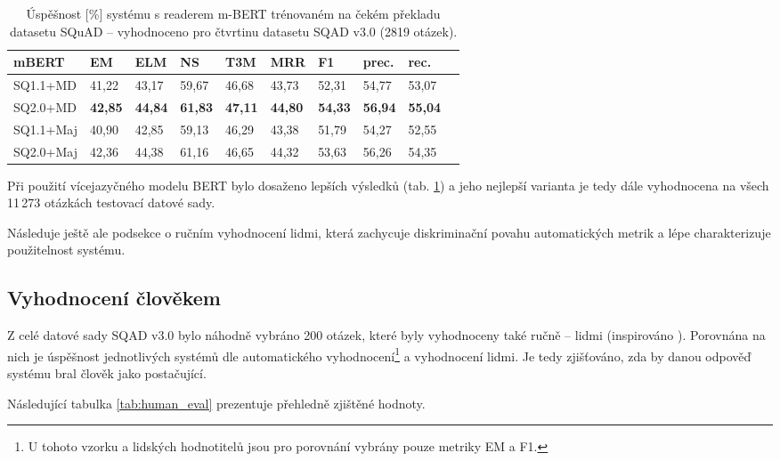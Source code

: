 \begin{table}[H]
    \centering
    \begin{tabular}{|l||l|l|l|l|l|l|l|l|l|}
        \hline
        \textbf{mBERT}  & \textbf{EM}   & ELM       & NS        & T3M       & MRR       & \textbf{F1}   & prec.         & rec.      \\ \hline\hline
            SQ1.1+MD    & 41,22         & 43,17     & 59,67     & 46,68     & 43,73     & 52,31         & 54,77         & 53,07     \\ \hline
            SQ2.0+MD    & \textbf{42,85}&\textbf{44,84}&\textbf{61,83}&\textbf{47,11}&\textbf{44,80}&\textbf{54,33}&\textbf{56,94}&\textbf{55,04}\\ \hline
            SQ1.1+Maj   & 40,90         & 42,85     & 59,13     & 46,29     & 43,38     & 51,79         & 54,27         & 52,55         \\ \hline
            SQ2.0+Maj   & 42,36         & 44,38     & 61,16     & 46,65     & 44,32     & 53,63         & 56,26         & 54,35     \\ \hline
    \end{tabular}
    \caption{Úspěšnost [\%] systému s readerem m-BERT trénovaném na čekém překladu datasetu SQuAD -- vyhodnoceno pro čtvrtinu datasetu SQAD v3.0 (2819 otázek).}
    \label{tab:system_eval_mbert}
\end{table}

Při použití vícejazyčného modelu BERT bylo dosaženo lepších výsledků (tab. \ref{tab:system_eval_mbert}) a jeho nejlepší varianta je tedy dále vyhodnocena na všech 11\,273 otázkách testovací datové sady.\par
Následuje ještě ale podsekce o ručním vyhodnocení lidmi, která zachycuje diskriminační povahu automatických metrik a lépe charakterizuje použitelnost systému.\pagebreak

\subsection{Vyhodnocení člověkem}
\label{human_eval}
Z celé datové sady SQAD v3.0 bylo náhodně vybráno 200 otázek, které byly vyhodnoceny také ručně -- lidmi (inspirováno \cite{min2021neurips}). Porovnána na nich je úspěšnost jednotlivých systémů dle automatického vyhodnocení\footnote{U tohoto vzorku a lidských hodnotitelů jsou pro porovnání vybrány pouze metriky EM a F1.} a vyhodnocení lidmi. Je tedy zjišťováno, zda by danou odpověď systému bral člověk jako postačující.\par
Následující tabulka \ref{tab:human_eval} prezentuje přehledně zjištěné hodnoty.

